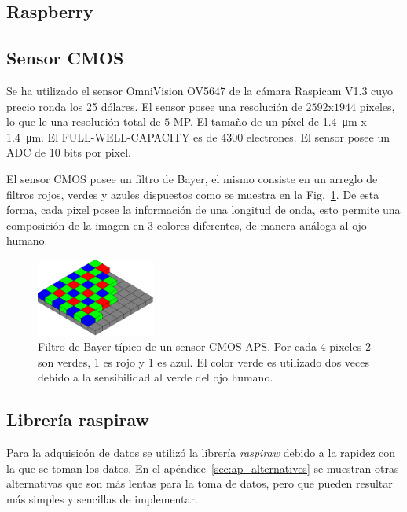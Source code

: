 \documentclass[twoside,twocolumn]{article}
\begin{document}
    \subsection{Raspberry}

    \subsection{Sensor CMOS}
      Se ha utilizado el sensor OmniVision OV5647 de la cámara Raspicam V1.3 cuyo precio ronda los 25 dólares.
      El sensor posee una resolución de	$2592$x$1944$ pixeles, lo que le una resolución total de $5$ MP.
      El tamaño de un píxel de \SI{1.4}{\micro\meter} x \SI{1.4}{\micro\meter}.
      El FULL-WELL-CAPACITY es de $4300$ electrones. %
      El sensor posee un ADC de 10 bits por pixel.

      El sensor CMOS posee un filtro de Bayer, el mismo consiste en un arreglo de filtros rojos, verdes y azules
      dispuestos como se muestra en la Fig.~\ref{fig:bayer}. De esta forma, cada pixel posee la información de una longitud de onda,
      esto permite una composición de la imagen en 3 colores diferentes, de manera análoga al ojo humano.

      \begin{figure}[h]
        \includegraphics[width=0.35\textwidth]{figures/Bayer_pattern.png}
        \caption{Filtro de Bayer típico de un sensor CMOS-APS. Por cada 4 pixeles 2 son verdes, 1 es rojo y 1 es azul.
          El color verde es utilizado dos veces debido a la sensibilidad al verde del ojo humano.}
        \label{fig:bayer}
      \end{figure}

    \subsection{Librería raspiraw}
      Para la adquisicón de datos se utilizó la librería {\it raspiraw}\cite{raspiraw} debido a la rapidez con la que se toman los datos.
      En el apéndice~\ref{sec:ap_alternatives} se muestran otras alternativas que son más lentas para la toma de datos,
      pero que pueden resultar más simples y sencillas de implementar.
\end{document}
